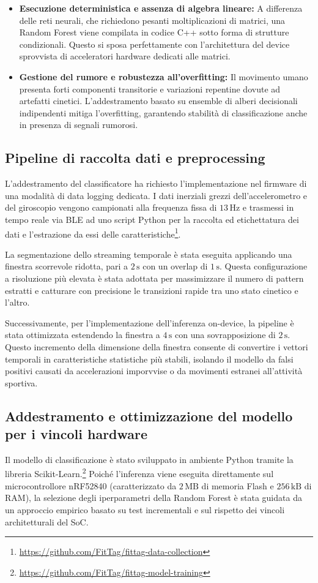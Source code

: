 \begin{itemize}
    \item \textbf{Esecuzione deterministica e assenza di algebra lineare:} A differenza delle reti neurali, che richiedono pesanti moltiplicazioni di matrici, una Random Forest viene compilata in codice C++ sotto forma di strutture condizionali. Questo si sposa perfettamente con l'architettura del device sprovvista di acceleratori hardware dedicati alle matrici.
    \item \textbf{Gestione del rumore e robustezza all'overfitting:} Il movimento umano presenta forti componenti transitorie e variazioni repentine dovute ad artefatti cinetici. L'addestramento basato su ensemble di alberi decisionali indipendenti mitiga l'overfitting, garantendo stabilità di classificazione anche in presenza di segnali rumorosi.
\end{itemize}

\subsection{Pipeline di raccolta dati e preprocessing}
L'addestramento del classificatore ha richiesto l'implementazione nel firmware di una modalità di data logging dedicata.
I dati inerziali grezzi dell'accelerometro e del giroscopio vengono campionati alla frequenza fissa di $13\,\text{Hz}$ e trasmessi in tempo reale via BLE ad uno script Python per la raccolta ed etichettatura dei dati e l'estrazione da essi delle caratteristiche\footnote{\url{https://github.com/FitTag/fittag-data-collection}}.

La segmentazione dello streaming temporale è stata eseguita applicando una finestra scorrevole ridotta, pari a $2\,\text{s}$ con un overlap di $1\,\text{s}$. Questa configurazione a risoluzione più elevata è stata adottata per massimizzare il numero di pattern estratti e catturare con precisione le transizioni rapide tra uno stato cinetico e l'altro. 

Successivamente, per l'implementazione dell'inferenza on-device, la pipeline è stata ottimizzata estendendo la finestra a $4\,\text{s}$ con una sovrapposizione di $2\,\text{s}$. Questo incremento della dimensione della finestra consente di convertire i vettori temporali in caratteristiche statistiche più stabili, isolando il modello da falsi positivi causati da accelerazioni imporvvise o da movimenti estranei all'attività sportiva.

\subsection{Addestramento e ottimizzazione del modello per i vincoli hardware}
Il modello di classificazione è stato sviluppato in ambiente Python tramite la libreria Scikit-Learn.\footnote{\url{https://github.com/FitTag/fittag-model-training}}
Poiché l'inferenza viene eseguita direttamente sul microcontrollore nRF52840 (caratterizzato da $2\,\text{MB}$ di memoria Flash e $256\,\text{kB}$ di RAM), la selezione degli iperparametri della Random Forest è stata guidata da un approccio empirico basato su test incrementali e sul rispetto dei vincoli architetturali del SoC.

